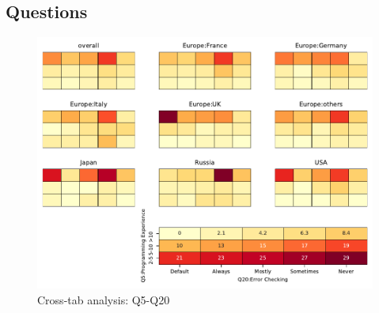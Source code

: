 
\subsection{Questions}


\begin{figure}
\begin{center}
\includegraphics[width=12cm]{../pdfs/Q5-Q20.pdf}
\caption{Cross-tab analysis: Q5-Q20}
\label{fig:Q5-Q20}
\end{center}
\end{figure}
